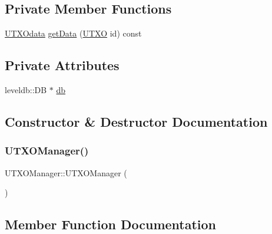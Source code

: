 \subsection*{Private Member Functions}
\begin{DoxyCompactItemize}
\item 
\mbox{\hyperlink{structUTXOdata}{U\+T\+X\+Odata}} \mbox{\hyperlink{classUTXOManager_a7aabe910f5f8d24604d33429f5d4bafd}{get\+Data}} (\mbox{\hyperlink{utxo_8hpp_a19091d002da03ec92277e19295ac4540}{U\+T\+XO}} id) const
\end{DoxyCompactItemize}
\subsection*{Private Attributes}
\begin{DoxyCompactItemize}
\item 
leveldb\+::\+DB $\ast$ \mbox{\hyperlink{classUTXOManager_a41e7280e7d1384aca9dbf2e15b1085cf}{db}}
\end{DoxyCompactItemize}


\subsection{Constructor \& Destructor Documentation}
\mbox{\label{classUTXOManager_aa08c4e17616d0a2436df1c8307b5da26}} 
\subsubsection{\texorpdfstring{U\+T\+X\+O\+Manager()}{UTXOManager()}}
{\footnotesize\ttfamily U\+T\+X\+O\+Manager\+::\+U\+T\+X\+O\+Manager (\begin{DoxyParamCaption}{ }\end{DoxyParamCaption})}



\subsection{Member Function Documentation}
\mbox{\label{classUTXOManager_ab0ed356ad058c35e0bd4f97a8eb34380}} 
